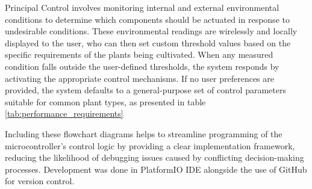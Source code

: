 Principal Control involves monitoring internal and external environmental conditions to determine which components should be actuated in response to undesirable conditions. These environmental readings are wirelessly and locally displayed to the user, who can then set custom threshold values based on the specific requirements of the plants being cultivated. When any measured condition falls outside the user-defined thresholds, the system responds by activating the appropriate control mechanisms. If no user preferences are provided, the system defaults to a general-purpose set of control parameters suitable for common plant types, as presented in table \ref{tab:performance_requirements}

Including these flowchart diagrams helps to streamline programming of the microcontroller’s control logic by providing a clear implementation framework, reducing the likelihood of debugging issues caused by conflicting decision-making processes. Development was done in PlatformIO IDE alongside the use of GitHub for version control.